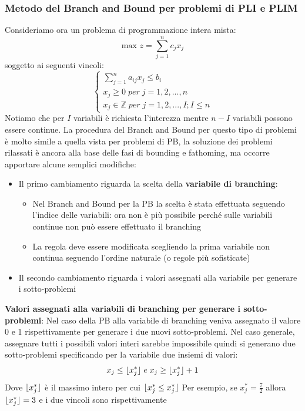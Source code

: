 \documentclass[12pt]{article}
\DeclarePairedDelimiter\floor{\lfloor}{\rfloor}
\begin{document}
\subsubsection{Metodo del Branch and Bound per problemi di PLI e PLIM}
Consideriamo ora un problema di programmazione intera mista:
$$\textrm{max } z = \sum_{j=1}^{n}c_j x_j$$
soggetto ai seguenti vincoli:
$$\begin{cases}
    \sum_{j=1}^{n}a_{ij}x_j \leq b_i \\
    x_j \geq 0 \; per \; j=1,2,...,n \\
    x_j \in \mathbb{Z} \; per \; j = 1,2,...,I; I \leq n
\end{cases}$$
Notiamo che per $I$ variabili è richiesta l'interezza mentre $n-I$ variabili possono essere continue.
La procedura del Branch and Bound per questo tipo di problemi è molto simile a quella vista per problemi di PB, la
soluzione dei problemi rilassati è ancora alla base delle fasi di bounding e fathoming, ma occorre apportare alcune semplici modifiche:
\begin{itemize}
    \item Il primo cambiamento riguarda la scelta della \textbf{variabile di branching}:
    \begin{itemize}
        \item Nel Branch and Bound per la PB la scelta è stata effettuata seguendo l'indice delle variabili: ora non è 
        più possibile perché sulle variabili continue non può essere effettuato il branching
        \item La regola deve essere modificata scegliendo la prima variabile non continua seguendo l'ordine naturale (o regole più sofisticate)
    \end{itemize}
    \item Il secondo cambiamento riguarda i valori assegnati alla variabile per generare i sotto-problemi
\end{itemize}
\textbf{Valori assegnati alla variabili di branching per generare i sotto-problemi}: \newline
Nel caso della PB alla variabile di branching veniva assegnato il valore 0 e 1 rispettivamente per generare
i due nuovi sotto-problemi. Nel caso generale, assegnare tutti i possibili valori interi sarebbe impossibile 
quindi si generano due sotto-problemi specificando per la variabile due insiemi di valori:
$$x_j \leq \floor{x_j^*} \; e \; x_j \geq \floor{x_j^*} + 1$$
Dove $\floor{x_j^*}$ è il massimo intero per cui $\floor{x_j^* \leq x_j^*}$
Per esempio, se $x_j^* = \frac{7}{2}$ allora $\floor{x_j^*} = 3$ e i due vincoli sono rispettivamente
\end{document}
